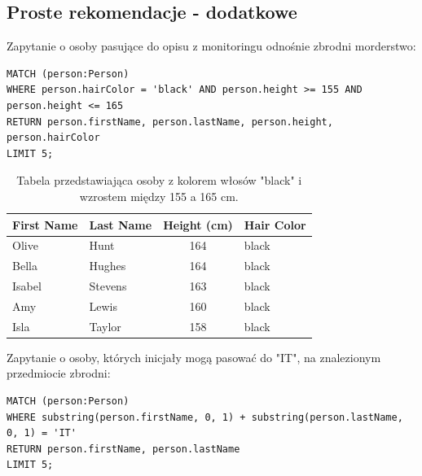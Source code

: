 \documentclass[a4paper,12pt]{article}
\begin{document}
\subsection{Proste rekomendacje - dodatkowe}

Zapytanie o osoby pasujące do opisu z monitoringu odnośnie zbrodni morderstwo:

\begin{center}
\begin{minipage}{0.8\linewidth}
\begin{lstlisting}[language=Cypher, basicstyle=\small, breaklines=true]
MATCH (person:Person)
WHERE person.hairColor = 'black' AND person.height >= 155 AND person.height <= 165
RETURN person.firstName, person.lastName, person.height, person.hairColor
LIMIT 5;
\end{lstlisting}
\end{minipage}
\end{center}

\begin{table}[h!]
\centering
\begin{tabular}{|l|l|c|l|}
\hline
\textbf{First Name} & \textbf{Last Name} & \textbf{Height (cm)} & \textbf{Hair Color} \\ \hline
Olive              & Hunt               & 164                  & black               \\ \hline
Bella              & Hughes             & 164                  & black               \\ \hline
Isabel             & Stevens            & 163                  & black               \\ \hline
Amy                & Lewis              & 160                  & black               \\ \hline
Isla               & Taylor             & 158                  & black               \\ \hline
\end{tabular}
\caption{Tabela przedstawiająca osoby z kolorem włosów "black" i wzrostem między 155 a 165 cm.}
\label{tab:black_hair_height}
\end{table}

Zapytanie o osoby, których inicjały mogą pasować do "IT", na znalezionym przedmiocie zbrodni:

\begin{center}
\begin{minipage}{0.8\linewidth}
\begin{lstlisting}[language=Cypher, basicstyle=\small, breaklines=true]
MATCH (person:Person)
WHERE substring(person.firstName, 0, 1) + substring(person.lastName, 0, 1) = 'IT'
RETURN person.firstName, person.lastName
LIMIT 5;
\end{lstlisting}
\end{minipage}
\end{center}
\end{document}
